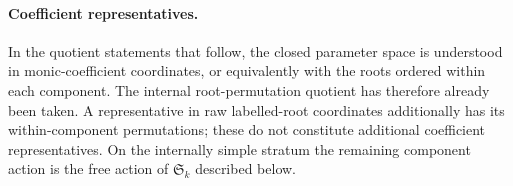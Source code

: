 \documentclass[11pt,reqno]{amsart}
\numberwithin{equation}{section}
\theoremstyle{definition}\newtheorem{definition}[theorem]{Definition}
\theoremstyle{remark}\newtheorem{remark}[theorem]{Remark}
\begin{document}
\paragraph{Coefficient representatives.}
In the quotient statements that follow, the closed parameter space is
understood in monic-coefficient coordinates, or equivalently with the
roots ordered within each component. The internal root-permutation
quotient has therefore already been taken. A representative in raw
labelled-root coordinates additionally has its within-component
permutations; these do not constitute additional coefficient
representatives. On the internally simple stratum the remaining
component action is the free action of $\mathfrak S_k$ described below.












\end{document}
